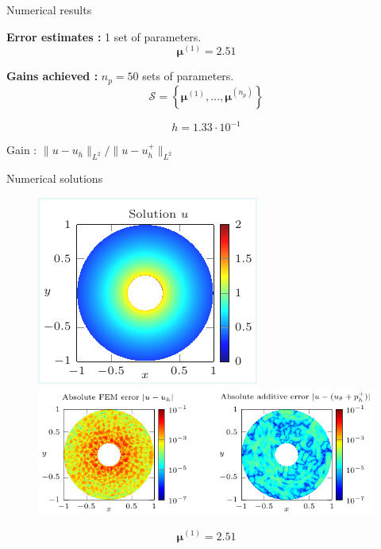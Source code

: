 \begin{frame}{Numerical results}
	\hspace{-5pt}\begin{minipage}[t]{0.46\linewidth}
		\textbf{Error estimates :} 1 set of parameters.
		$$\bm{\mu}^{(1)}=2.51$$
		\vspace{-35pt}
		\begin{figure}[H]
		\end{figure}
	\end{minipage} \qquad \small
	\begin{minipage}[t]{0.48\linewidth}
		\textbf{Gains achieved :} $n_p=50$ sets of parameters.
		$$\mathcal{S}=\left\{\bm{\mu}^{(1)},\dots,\bm{\mu}^{(n_p)}\right\}$$
		\vspace{-15pt}
		\begin{table}[H]
		\end{table}

		\normalsize\centering\vspace{-20pt}
		$$h=1.33\cdot 10^{-1}$$

		\vspace{-5pt}
		Gain : $\| u-u_h\|_{L^2} / \| u-u_h^+\|_{L^2}$ \\
		\end{minipage}
\end{frame}

\begin{frame}{Numerical solutions}
	\begin{figure}[!ht] \centering
		\includegraphics[width=0.31\linewidth]{images/numeric/poisson/mixed/plots/standalone_solutions_cropped.pdf}
		\includegraphics[width=0.7\linewidth]{images/numeric/poisson/mixed/plots/standalone_errors.pdf}
	\end{figure}

	\vspace{-8pt}
	$$\bm{\mu}^{(1)}=2.51 $$
\end{frame}